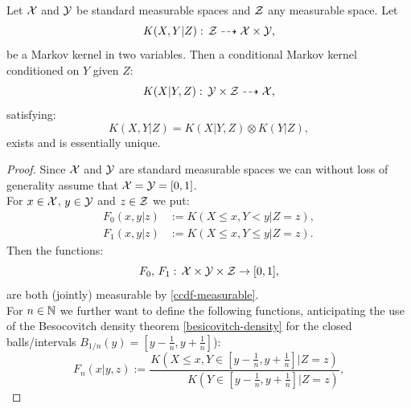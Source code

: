 \begin{Thm}
\label{reg-cond-trans-kernel-existence-I}
Let $\mathcal{X}$ and $\mathcal{Y}$ be standard measurable spaces and $\mathcal{Z}$ any measurable space. Let 
\[K(X,Y|Z): \, \mathcal{Z} \dashrightarrow  \mathcal{X} \times \mathcal{Y},\]
be a Markov kernel in two variables. 
Then a conditional Markov kernel
conditioned on $Y$ given $Z$:
\[K(X|Y,Z): \, \mathcal{Y} \times \mathcal{Z} \dashrightarrow  \mathcal{X},\]
satisfying:
\[K(X,Y|Z) = K(X|Y,Z) \otimes K(Y|Z),\]
exists and is essentially unique.
\begin{proof}
    Since $\mathcal{X}$ and $\mathcal{Y}$ are standard measurable spaces we can
without loss of generality assume that $\mathcal{X}=\mathcal{Y}=[0,1]$.\\
For $x \in \mathcal{X}$, $y \in \mathcal{Y}$ and $z \in \mathcal{Z}$ we put:
    \begin{align*}
        F_0(x,y|z) &:= K(X \le x, Y< y|Z=z),\\
        F_1(x,y|z) &:= K(X \le x, Y\le y|Z=z).
    \end{align*}
Then the functions:
    \[ F_0,\,F_1:\, \mathcal{X} \times \mathcal{Y} \times \mathcal{Z} \to [0,1],\]
are both (jointly) measurable by \ref{ccdf-measurable}.\\
For $n \in \mathbb{N}$  we further want to define the following functions, anticipating the use of the Besocovitch density theorem \ref{besicovitch-density} 
for the closed balls/intervals
$B_{1/n}(y)=[y-\frac{1}{n},y+\frac{1}{n}]$):
\[F_n(x|y,z):=\frac{K(X \le x, Y \in [y-\frac{1}{n},y+\frac{1}{n}]|Z=z)}%
{\phantom{X \le x,\,}K(Y \in [y-\frac{1}{n},y+\frac{1}{n}]|Z=z)},\] 

\end{proof}
\end{Thm}
